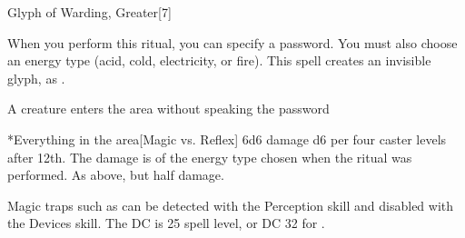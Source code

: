 \begin{spellsection}{Glyph of Warding, Greater}[7]
    \begin{spellheader}
    \end{spellheader}
    \begin{spellcontent}
        \begin{spelltargetinginfo}
        \end{spelltargetinginfo}
        \begin{spelleffects}

            \spellspecial When you perform this ritual, you can specify a password. You must also choose an energy type (acid, cold, electricity, or fire).
            \spellline
            \spelleffect This spell creates an invisible glyph, as .
            \begin{spelltrigger}{A creature enters the area without speaking the password}
                \begin{spelltargets}*{Everything in the area}[Magic vs. Reflex]
                    \spellsuccess 6d6 damage \add d6 per four caster levels after 12th. The damage is of the energy type chosen when the ritual was performed.
                    \spellfailure As above, but half damage.
                \end{spelltargets}
            \end{spelltrigger}
        \end{spelleffects}
    \end{spellcontent}
    \begin{spellfooter}
        \spellnotes Magic traps such as  can be detected with the Perception skill and disabled with the Devices skill. The DC is 25 \add spell level, or DC 32 for .
    \end{spellfooter}
\end{spellsection}


